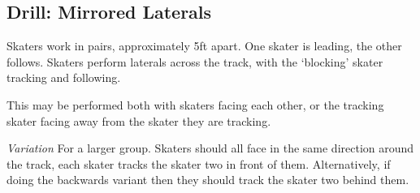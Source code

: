 \subsection*{Drill: Mirrored Laterals}
\label{drill:laterals/mirrored}

Skaters work in pairs, approximately 5ft apart. 
One skater is leading, the other follows.
Skaters perform laterals across the track, with the `blocking' skater tracking and following.

This may be performed both with skaters facing each other, or the tracking skater facing away from the skater they are tracking. 



{\it Variation}
For a larger group.
Skaters should all face in the same direction around the track, each skater tracks the skater two in front of them.
Alternatively, if doing the backwards variant then they should track the skater two behind them.
